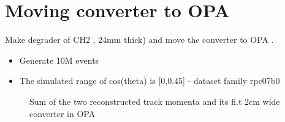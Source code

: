 %
\section{Moving converter to OPA}

Make degrader of CH2 , 24mm thick) and move the converter to OPA .
\begin{itemize}
\item
  Generate 10M events
\item 
  The simulated range of cos(theta) is [0,0.45] - dataset family rpc07b0
\end{itemize}

\begin{figure}[H]
  \caption{
    \label{figure:t2_1_smom_0}
    Sum of the two reconstructed track momenta and its fi.t 2cm wide converter in OPA
  }
  \label{figure:event_display}
\end{figure}


